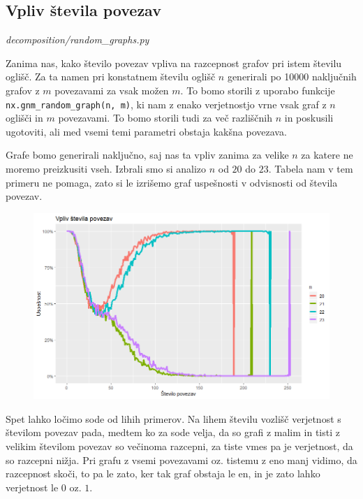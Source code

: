 \documentclass[12pt,a4paper]{amsart}
\theoremstyle{definition} %
\theoremstyle{plain} %
\begin{document}
\subsection{Vpliv števila povezav}
\emph{decomposition/random\_graphs.py}

Zanima nas, kako število povezav vpliva na razcepnost grafov pri istem številu oglišč. Za ta namen pri konstatnem številu
oglišč $n$ generirali po 10000 naključnih grafov z $m$ povezavami za vsak možen $m$. To bomo storili z uporabo funkcije \texttt{nx.gnm\_random\_graph(n, m)},
ki nam z enako verjetnostjo vrne vsak graf z $n$ oglišči in $m$ povezavami. To bomo storili tudi za več razliščnih $n$ in
poskusili ugotoviti, ali med vsemi temi parametri obstaja kakšna povezava.

Grafe bomo generirali naključno, saj nas ta vpliv zanima za velike $n$ za katere ne moremo preizkusiti vseh. Izbrali smo si
analizo $n$ od $20$ do $23$.
Tabela nam v tem primeru ne pomaga, zato si le izrišemo graf uspešnosti v odvisnosti od števila povezav.

\begin{figure}[h]
\centering
\includegraphics[width=1\textwidth]{images/random_graphs.png}
\end{figure}

Spet lahko ločimo sode od lihih primerov. Na lihem številu vozlišč verjetnost s številom povezav
pada, medtem ko za sode velja, da so grafi z malim in tisti z velikim številom povezav so večinoma razcepni, za tiste vmes pa je verjetnost,
da so razcepni nižja. Pri grafu z vsemi povezavami oz. tistemu z eno manj vidimo, da razcepnost skoči,
to pa le zato, ker tak graf obstaja le en, in je zato lahko verjetnost le $0$ oz. $1$.

\pagebreak
\end{document}

